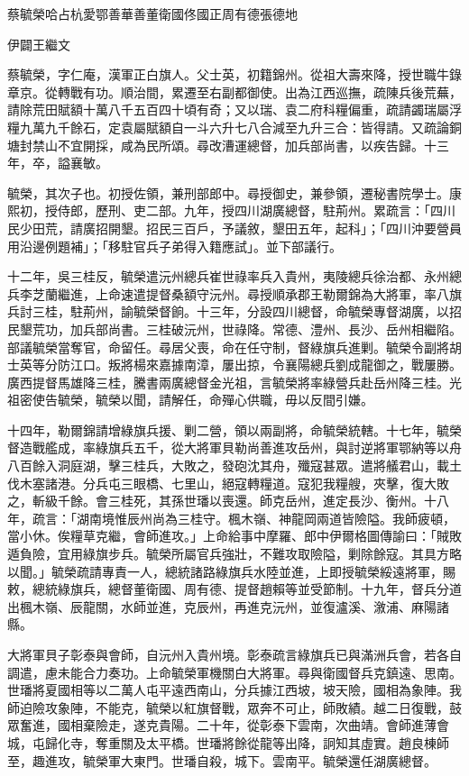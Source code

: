 
\begin{pinyinscope}
蔡毓榮哈占杭愛鄂善華善董衛國佟國正周有德張德地

伊闢王繼文

蔡毓榮，字仁庵，漢軍正白旗人。父士英，初籍錦州。從祖大壽來降，授世職牛錄章京。從轉戰有功。順治間，累遷至右副都御使。出為江西巡撫，疏陳兵後荒蕪，請除荒田賦額十萬八千五百四十頃有奇；又以瑞、袁二府科糧偏重，疏請蠲瑞屬浮糧九萬九千餘石，定袁屬賦額自一斗六升七八合減至九升三合：皆得請。又疏論銅塘封禁山不宜開採，咸為民所頌。尋改漕運總督，加兵部尚書，以疾告歸。十三年，卒，謚襄敏。

毓榮，其次子也。初授佐領，兼刑部郎中。尋授御史，兼參領，遷秘書院學士。康熙初，授侍郎，歷刑、吏二部。九年，授四川湖廣總督，駐荊州。累疏言：「四川民少田荒，請廣招開墾。招民三百戶，予議敘，墾田五年，起科」；「四川沖要營員用沿邊例題補」；「移駐官兵子弟得入籍應試」。並下部議行。

十二年，吳三桂反，毓榮遣沅州總兵崔世祿率兵入貴州，夷陵總兵徐治都、永州總兵李芝蘭繼進，上命速遣提督桑額守沅州。尋授順承郡王勒爾錦為大將軍，率八旗兵討三桂，駐荊州，諭毓榮督餉。十三年，分設四川總督，命毓榮專督湖廣，以招民墾荒功，加兵部尚書。三桂破沅州，世祿降。常德、澧州、長沙、岳州相繼陷。部議毓榮當奪官，命留任。尋居父喪，命在任守制，督綠旗兵進剿。毓榮令副將胡士英等分防江口。叛將楊來嘉據南漳，屢出掠，令襄陽總兵劉成龍御之，戰屢勝。廣西提督馬雄降三桂，騰書兩廣總督金光祖，言毓榮將率綠營兵赴岳州降三桂。光祖密使告毓榮，毓榮以聞，請解任，命殫心供職，毋以反間引嫌。

十四年，勒爾錦請增綠旗兵援、剿二營，領以兩副將，命毓榮統轄。十七年，毓榮督造戰艦成，率綠旗兵五千，從大將軍貝勒尚善進攻岳州，與討逆將軍鄂納等以舟八百餘入洞庭湖，擊三桂兵，大敗之，發砲沈其舟，殲寇甚眾。遣將艤君山，載土伐木塞諸港。分兵屯三眼橋、七里山，絕寇轉糧道。寇犯我糧艘，夾擊，復大敗之，斬級千餘。會三桂死，其孫世璠以喪還。師克岳州，進定長沙、衡州。十八年，疏言：「湖南境惟辰州尚為三桂守。楓木嶺、神龍岡兩道皆險隘。我師疲頓，當小休。俟糧草克繼，會師進攻。」上命給事中摩羅、郎中伊爾格圖傳諭曰：「賊敗遁負險，宜用綠旗步兵。毓榮所屬官兵強壯，不難攻取險隘，剿除餘寇。其具方略以聞。」毓榮疏請專責一人，總統諸路綠旗兵水陸並進，上即授毓榮綏遠將軍，賜敕，總統綠旗兵，總督董衛國、周有德、提督趙賴等並受節制。十九年，督兵分道出楓木嶺、辰龍關，水師並進，克辰州，再進克沅州，並復瀘溪、漵浦、麻陽諸縣。

大將軍貝子彰泰與會師，自沅州入貴州境。彰泰疏言綠旗兵已與滿洲兵會，若各自調遣，慮未能合力奏功。上命毓榮軍機關白大將軍。尋與衛國督兵克鎮遠、思南。世璠將夏國相等以二萬人屯平遠西南山，分兵據江西坡，坡天險，國相為象陣。我師迫險攻象陣，不能克，毓榮以紅旗督戰，眾奔不可止，師敗績。越二日復戰，鼓眾奮進，國相棄險走，遂克貴陽。二十年，從彰泰下雲南，次曲靖。會師進薄會城，屯歸化寺，奪重關及太平橋。世璠將餘從龍等出降，詗知其虛實。趙良棟師至，趣進攻，毓榮軍大東門。世璠自殺，城下。雲南平。毓榮還任湖廣總督。


\end{pinyinscope}
